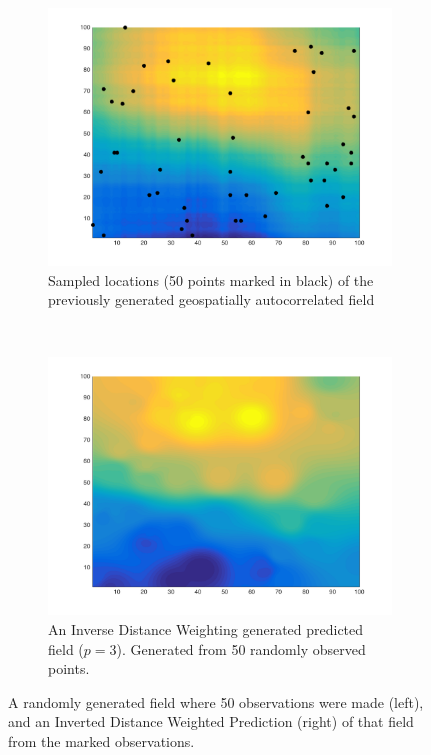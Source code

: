 \documentclass[11pt]{ucthesis}
\begin{document}
\begin{figure}[ht!]
    \centering
    \begin{subfigure}[t]{0.5\textwidth}
        \centering
        \includegraphics[width=\linewidth]{figures/sampled_generated_field.png}
        \captionsetup{skip=0.5\baselineskip,size=footnotesize}
        \caption{Sampled locations (50 points marked in black) of the previously generated geospatially autocorrelated field}
		\label{fig:sampled_field}
    \end{subfigure}%
    ~ 
    \begin{subfigure}[t]{0.5\textwidth}
        \centering
        \includegraphics[width=\linewidth]{figures/idw_predicted_field.png}
		\captionsetup{skip=0.5\baselineskip,size=footnotesize}
		\caption{An Inverse Distance Weighting generated predicted field ($p=3$). Generated from 50 randomly observed points.}
		\label{fig:idw_field}
    \end{subfigure}
    \captionsetup{skip=0.5\baselineskip,size=footnotesize}
    \caption{A randomly generated field where 50 observations were made (left), and an Inverted Distance Weighted Prediction (right) of that field from the marked observations.}
    \label{fig:idw_side_by_side}
\end{figure}
\end{document}
